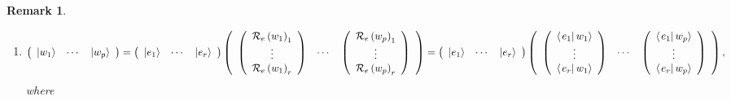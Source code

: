 \documentclass[aps,preprint]{revtex4}%
\newtheorem{remark}[theorem]{Remark}
\begin{document}
\begin{remark}
\begin{enumerate}
\begin{enumerate}
\item
\begin{equation}
\left(
\begin{array}
[c]{ccc}%
\left\vert w_{1}\right\rangle  & \cdots & \left\vert w_{p}\right\rangle
\end{array}
\right)  =\left(
\begin{array}
[c]{ccc}%
\left\vert e_{1}\right\rangle  & \cdots & \left\vert e_{r}\right\rangle
\end{array}
\right)  \left(
\begin{array}
[c]{ccc}%
\left(
\begin{array}
[c]{c}%
\mathcal{R}_{e}\left(  w_{1}\right)  _{1}\\
\vdots\\
\mathcal{R}_{e}\left(  w_{1}\right)  _{r}%
\end{array}
\right)  & \cdots & \left(
\begin{array}
[c]{c}%
\mathcal{R}_{e}\left(  w_{p}\right)  _{1}\\
\vdots\\
\mathcal{R}_{e}\left(  w_{p}\right)  _{r}%
\end{array}
\right)
\end{array}
\right)  =\left(
\begin{array}
[c]{ccc}%
\left\vert e_{1}\right\rangle  & \cdots & \left\vert e_{r}\right\rangle
\end{array}
\right)  \left(
\begin{array}
[c]{ccc}%
\left(
\begin{array}
[c]{c}%
\left\langle \left.  e_{1}\right\vert w_{1}\right\rangle \\
\vdots\\
\left\langle \left.  e_{r}\right\vert w_{1}\right\rangle
\end{array}
\right)  & \cdots & \left(
\begin{array}
[c]{c}%
\left\langle \left.  e_{1}\right\vert w_{p}\right\rangle \\
\vdots\\
\left\langle \left.  e_{r}\right\vert w_{p}\right\rangle
\end{array}
\right)
\end{array}
\right)  ,
\end{equation}
where


\end{enumerate}
\end{enumerate}
\end{remark}
\end{document}
